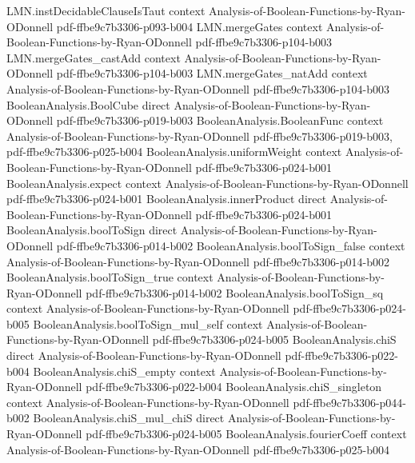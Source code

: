 \begin{theorem}
  {LMN.instDecidableClauseIsTaut}
  {context}
  {Analysis-of-Boolean-Functions-by-Ryan-ODonnell}
  {pdf-ffbe9c7b3306-p093-b004}
\proofstep
  {LMN.mergeGates}
  {context}
  {Analysis-of-Boolean-Functions-by-Ryan-ODonnell}
  {pdf-ffbe9c7b3306-p104-b003}
\proofstep
  {LMN.mergeGates_castAdd}
  {context}
  {Analysis-of-Boolean-Functions-by-Ryan-ODonnell}
  {pdf-ffbe9c7b3306-p104-b003}
\proofstep
  {LMN.mergeGates_natAdd}
  {context}
  {Analysis-of-Boolean-Functions-by-Ryan-ODonnell}
  {pdf-ffbe9c7b3306-p104-b003}
\proofstep
  {BooleanAnalysis.BoolCube}
  {direct}
  {Analysis-of-Boolean-Functions-by-Ryan-ODonnell}
  {pdf-ffbe9c7b3306-p019-b003}
\proofstep
  {BooleanAnalysis.BooleanFunc}
  {context}
  {Analysis-of-Boolean-Functions-by-Ryan-ODonnell}
  {pdf-ffbe9c7b3306-p019-b003,
    pdf-ffbe9c7b3306-p025-b004}
\proofstep
  {BooleanAnalysis.uniformWeight}
  {context}
  {Analysis-of-Boolean-Functions-by-Ryan-ODonnell}
  {pdf-ffbe9c7b3306-p024-b001}
\proofstep
  {BooleanAnalysis.expect}
  {context}
  {Analysis-of-Boolean-Functions-by-Ryan-ODonnell}
  {pdf-ffbe9c7b3306-p024-b001}
\proofstep
  {BooleanAnalysis.innerProduct}
  {direct}
  {Analysis-of-Boolean-Functions-by-Ryan-ODonnell}
  {pdf-ffbe9c7b3306-p024-b001}
\proofstep
  {BooleanAnalysis.boolToSign}
  {direct}
  {Analysis-of-Boolean-Functions-by-Ryan-ODonnell}
  {pdf-ffbe9c7b3306-p014-b002}
\proofstep
  {BooleanAnalysis.boolToSign_false}
  {context}
  {Analysis-of-Boolean-Functions-by-Ryan-ODonnell}
  {pdf-ffbe9c7b3306-p014-b002}
\proofstep
  {BooleanAnalysis.boolToSign_true}
  {context}
  {Analysis-of-Boolean-Functions-by-Ryan-ODonnell}
  {pdf-ffbe9c7b3306-p014-b002}
\proofstep
  {BooleanAnalysis.boolToSign_sq}
  {context}
  {Analysis-of-Boolean-Functions-by-Ryan-ODonnell}
  {pdf-ffbe9c7b3306-p024-b005}
\proofstep
  {BooleanAnalysis.boolToSign_mul_self}
  {context}
  {Analysis-of-Boolean-Functions-by-Ryan-ODonnell}
  {pdf-ffbe9c7b3306-p024-b005}
\proofstep
  {BooleanAnalysis.chiS}
  {direct}
  {Analysis-of-Boolean-Functions-by-Ryan-ODonnell}
  {pdf-ffbe9c7b3306-p022-b004}
\proofstep
  {BooleanAnalysis.chiS_empty}
  {context}
  {Analysis-of-Boolean-Functions-by-Ryan-ODonnell}
  {pdf-ffbe9c7b3306-p022-b004}
\proofstep
  {BooleanAnalysis.chiS_singleton}
  {context}
  {Analysis-of-Boolean-Functions-by-Ryan-ODonnell}
  {pdf-ffbe9c7b3306-p044-b002}
\proofstep
  {BooleanAnalysis.chiS_mul_chiS}
  {direct}
  {Analysis-of-Boolean-Functions-by-Ryan-ODonnell}
  {pdf-ffbe9c7b3306-p024-b005}
\proofstep
  {BooleanAnalysis.fourierCoeff}
  {context}
  {Analysis-of-Boolean-Functions-by-Ryan-ODonnell}
  {pdf-ffbe9c7b3306-p025-b004}

\end{theorem}
